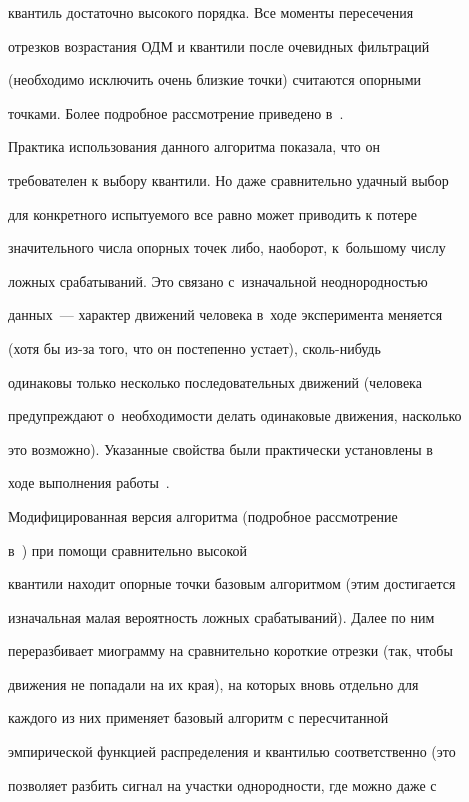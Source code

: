 квантиль достаточно высокого порядка. Все моменты пересечения


отрезков возрастания ОДМ и квантили после очевидных фильтраций


(необходимо исключить очень близкие точки) считаются опорными


точками. Более подробное рассмотрение приведено в~\cite{bi_2, bi_1}.





Практика использования данного алгоритма показала, что он


требователен к выбору квантили. Но даже сравнительно удачный выбор


для конкретного испытуемого все равно может приводить к потере


значительного числа опорных точек либо, наоборот, к~большому числу


ложных срабатываний. Это связано с~изначальной неоднородностью


данных~--- характер движений человека в~ходе эксперимента меняется


(хотя бы из-за того, что он постепенно устает), сколь-ни\-будь


одинаковы только несколько последовательных движений (человека


предупреж\-дают о~необходимости делать одинаковые движения, насколько


это возможно). Указанные свойства были практически установлены в


ходе выполнения работы~\cite{bi_7}.





Модифицированная версия алгоритма (подробное рассмотрение


в~\cite{bi_3}) при помощи сравнительно высокой


квантили находит опорные точки базовым алгоритмом (этим достигается


изначальная малая вероятность ложных срабатываний). Далее по ним


переразбивает миограмму на сравнительно короткие отрезки (так, чтобы


движения не попадали на их края), на которых вновь отдельно для


каждого из них применяет базовый алгоритм с пересчитанной


эмпирической функцией распределения и квантилью соответственно (это


позволяет разбить сигнал на участки однородности, где можно даже с


